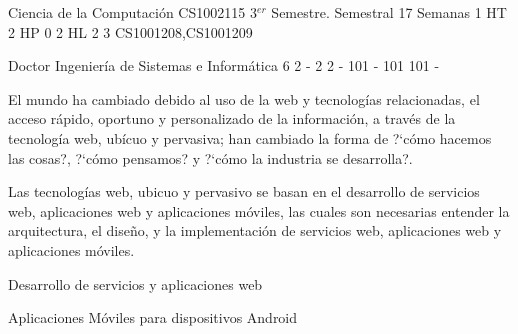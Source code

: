 \documentclass[a4paper,8pt]{article}
\begin{document}
\setNombreProfesor{}
\setGradoProfesorAbreviado{}
\sylabusHeader

\academicaTable
{Ciencia de la Computación} %
{CS1002115} %
{3$^{er}$ Semestre.} %
{Semestral} %
{17 Semanas} %
{1 HT} %
{2 HP} %
{0} %
{2 HL}  %
{2} %
{3} %
{CS1001208,CS1001209} %

\administrativaTable
{Doctor} %
{Ingeniería de Sistemas e Informática} %
{6} %
{2} %
{-} %
{2} %
{2} %
{-} %
{101} %
{-} %
{101} %
{101} %
{-} %


\begin{fundamentacion}
El mundo ha cambiado debido al uso de la web y tecnologías relacionadas, el acceso rápido, oportuno y personalizado de la
información, a través de la tecnología web, ubícuo  y pervasiva; han cambiado la forma de ?`cómo hacemos las cosas?, ?`cómo pensamos? y ?`cómo la industria se desarrolla?.

Las tecnologías web, ubicuo  y pervasivo se basan en el desarrollo de servicios web, aplicaciones web y aplicaciones móviles,
las cuales son necesarias entender la arquitectura, el diseño, y la implementación de servicios web, aplicaciones web y aplicaciones móviles.

\end{fundamentacion}

\begin{sumilla}
\item \PBDIntroduction
\item \PBDWebPlatforms
\item Desarrollo de servicios y aplicaciones web
\item \PBDMobilePlatforms
\item Aplicaciones Móviles para dispositivos Android

\end{sumilla}

\begin{competenciasAsignatura}
\item {}
\item {}
\item {}

\end{competenciasAsignatura}
\end{document}
